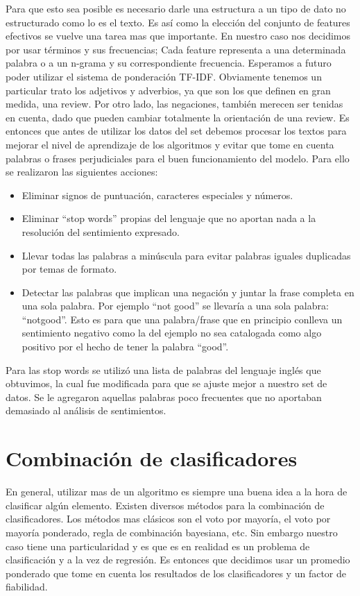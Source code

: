 \documentclass[a4paper,11pt]{report}
\begin{document}
Para que esto sea posible es necesario darle una estructura a un tipo de dato no estructurado como lo es el texto. Es así como la elección del conjunto de features efectivos se vuelve una tarea mas que importante. En nuestro caso nos decidimos por usar términos y sus frecuencias; Cada feature representa a una determinada palabra o a un n-grama y su correspondiente frecuencia. Esperamos a futuro poder utilizar el sistema de ponderación TF-IDF. 
Obviamente tenemos un particular trato los adjetivos y adverbios, ya que son los que definen en gran medida, una review. Por otro lado, las negaciones, también merecen ser tenidas en cuenta, dado que pueden cambiar totalmente la orientación de una review. 
Es entonces que antes de utilizar los datos del set debemos procesar los textos para mejorar el nivel de aprendizaje de los algoritmos y evitar que tome en cuenta palabras o frases perjudiciales para el buen funcionamiento del modelo. Para ello se realizaron las siguientes acciones:
\begin{itemize}
  \item Eliminar signos de puntuación, caracteres especiales y números.
  \item Eliminar “stop words” propias del lenguaje que no aportan nada a la resolución del sentimiento expresado.
  \item Llevar todas las palabras a minúscula para evitar palabras iguales duplicadas por temas de formato.
  \item Detectar las palabras que implican una negación y juntar la frase completa en una sola palabra. Por ejemplo “not good” se llevaría a una sola palabra: “notgood”. Esto es para que una palabra/frase que en principio conlleva un sentimiento negativo como la del ejemplo no sea catalogada como algo positivo por el hecho de tener la palabra “good”.
\end{itemize}

Para las stop words se utilizó una lista de palabras del lenguaje inglés que obtuvimos, la cual fue modificada para que se ajuste mejor a nuestro set de datos. Se le agregaron aquellas palabras poco frecuentes que no aportaban demasiado al análisis de sentimientos.  

\chapter{Combinación de clasificadores}
En general, utilizar mas de un algoritmo es siempre una buena idea a la hora de clasificar algún elemento. Existen diversos métodos para la combinación de clasificadores. Los métodos mas clásicos son el voto por mayoría, el voto por mayoría ponderado, regla de combinación bayesiana, etc. Sin embargo nuestro caso tiene una particularidad y es que es en realidad es un problema de clasificación y a la vez de regresión. Es entonces que decidimos usar un promedio ponderado que tome en cuenta los resultados de los clasificadores y un factor de fiabilidad. 
\end{document}
